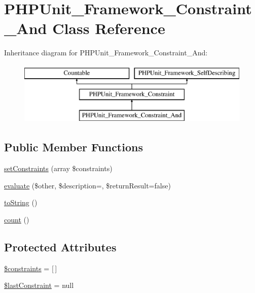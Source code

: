 \hypertarget{class_p_h_p_unit___framework___constraint___and}{}\section{P\+H\+P\+Unit\+\_\+\+Framework\+\_\+\+Constraint\+\_\+\+And Class Reference}
\label{class_p_h_p_unit___framework___constraint___and}
Inheritance diagram for P\+H\+P\+Unit\+\_\+\+Framework\+\_\+\+Constraint\+\_\+\+And\+:\begin{figure}[H]
\begin{center}
\leavevmode
\includegraphics[height=3.000000cm]{class_p_h_p_unit___framework___constraint___and}
\end{center}
\end{figure}
\subsection*{Public Member Functions}
\begin{DoxyCompactItemize}
\item 
\mbox{\hyperlink{class_p_h_p_unit___framework___constraint___and_aecb273becbedcf46aedb2d32075ae564}{set\+Constraints}} (array \$constraints)
\item 
\mbox{\hyperlink{class_p_h_p_unit___framework___constraint___and_a4c184790087f7d42c3daf0d0180fe5fb}{evaluate}} (\$other, \$description=\textquotesingle{}\textquotesingle{}, \$return\+Result=false)
\item 
\mbox{\hyperlink{class_p_h_p_unit___framework___constraint___and_a5558c5d549f41597377fa1ea8a1cefa3}{to\+String}} ()
\item 
\mbox{\hyperlink{class_p_h_p_unit___framework___constraint___and_ac751e87b3d4c4bf2feb03bee8b092755}{count}} ()
\end{DoxyCompactItemize}
\subsection*{Protected Attributes}
\begin{DoxyCompactItemize}
\item 
\mbox{\hyperlink{class_p_h_p_unit___framework___constraint___and_a9f4fd8838aaef9b57d3fac0dbf9a7929}{\$constraints}} = \mbox{[}$\,$\mbox{]}
\item 
\mbox{\hyperlink{class_p_h_p_unit___framework___constraint___and_a6abdf904716bf0f0a959ded0f39bab00}{\$last\+Constraint}} = null
\end{DoxyCompactItemize}
